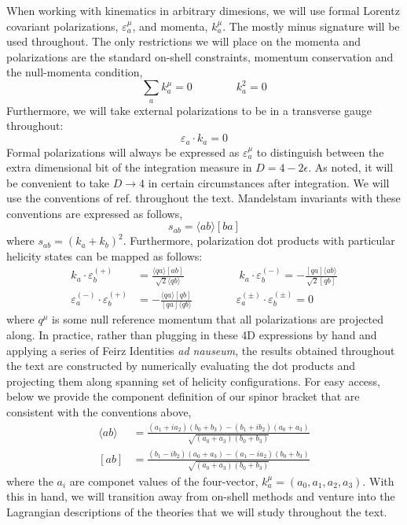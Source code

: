 \documentclass[12pt,letter]{article}
\def\be{\begin{equation}}
\def\ee{\end{equation}}
\begin{document}
When working with kinematics in arbitrary dimesions, we will use formal Lorentz covariant polarizations, $\varepsilon^\mu_a$, and momenta, $k^\mu_a$. The mostly minus signature will be used throughout. The only restrictions we will place on the momenta and polarizations are the standard on-shell constraints, momentum conservation and the null-momenta condition,
\be
\sum_{a} k_a^\mu =0 \qquad \qquad k_a^2 =0
\ee
Furthermore, we will take external polarizations to be in a transverse gauge throughout:
\be
\varepsilon_a \cdot k_a = 0
\ee
Formal polarizations will always be expressed as $\varepsilon_a^\mu$ to distinguish between the extra dimensional bit of the integration measure in $D=4-2\epsilon$. As noted, it will be convenient to take $D\rightarrow 4$ in certain circumstances after integration. We will use the conventions of ref. \cite{jjmcTASI2014} throughout the text. Mandelstam invariants with these conventions are expressed as follows, 
\be
s_{ab} = \langle ab \rangle[ba]
\ee
where $s_{ab} = (k_a+k_b)^2$. Furthermore, polarization dot products with particular helicity states can be mapped as follows:
\begin{align}
k_a \cdot \varepsilon_b^{(+)} &= \frac{\langle q a \rangle[ab]}{\sqrt{2}\langle q b\rangle}
\qquad\quad \qquad
k_a \cdot \varepsilon_b^{(-)} = -\frac{[qa]\langle ab\rangle}{\sqrt{2}[qb]}
\\
\varepsilon_a^{(-)}\cdot \varepsilon_b^{(+)} &= - \frac{\langle q a\rangle [qb]}{ [qa]\langle q b\rangle} 
\qquad \qquad
\varepsilon_a^{(\pm)}\cdot \varepsilon_b^{(\pm)} = 0 
\end{align}
where $q^\mu$ is some null reference momentum that all polarizations are projected along. In practice, rather than plugging in these 4D expressions by hand and applying a series of Feirz Identities \textit{ad nauseum}, the results obtained throughout the text are constructed by numerically evaluating the dot products and projecting them along spanning set of helicity configurations. For easy access, below we provide the component definition of our spinor bracket that are consistent with the conventions above,
\begin{align}
\langle ab \rangle &= \frac{(a_1 + i a_2)(b_0+b_3)-(b_1 + i b_2)(a_0+a_3)}{\sqrt{(a_0+a_3)(b_0+b_3)}}
\\
[ab] &= \frac{(b_1 - i b_2)(a_0+a_3)-(a_1 - i a_2)(b_0+b_3)}{\sqrt{(a_0+a_3)(b_0+b_3)}}
\end{align}
where the $a_i$ are componet values of the four-vector, $k^\mu_a = (a_0,a_1,a_2,a_3)$. With this in hand, we will transition away from on-shell methods and venture into the Lagrangian descriptions of the theories that we will study throughout the text. 
\end{document}
